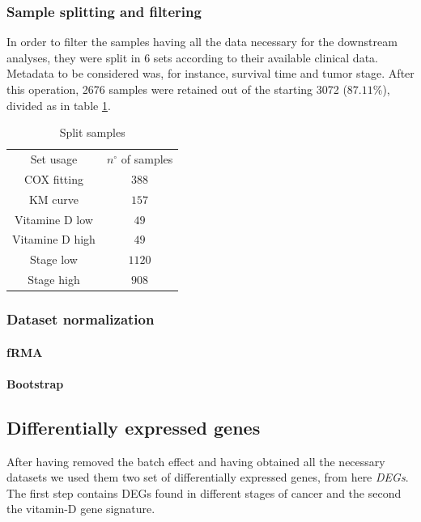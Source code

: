 \documentclass[fleqn,10pt]{SelfArx} %
\begin{document}
		\subsubsection{Sample splitting and filtering}
		In order to filter the samples having all the data necessary for the downstream analyses, they were split in 6 sets according to their available clinical data. Metadata to be considered was, for instance, survival time and tumor stage. After this operation, 2676 samples were retained out of the starting 3072 ($87.11\%$), divided as in table \ref{tab:samples_split}.

		\begin{table}[H]
			\centering
			\begin{tabular}{cc}
				\hline
				Set usage & $n^\circ$ of samples\\
				COX fitting & $388$\\
				KM curve & $157$\\
				Vitamine D low & $49$\\
				Vitamine D high & $49$\\
				Stage low & $1120$\\
				Stage high & $908$\\
				\hline
			\end{tabular}
			\caption{Split samples}
			\label{tab:samples_split}
		\end{table}

		\subsubsection{Dataset normalization}

			\paragraph{fRMA}

			\paragraph{Bootstrap}

	\subsection{Differentially expressed genes}
	After having removed the batch effect and having obtained all the necessary datasets we used them two set of differentially expressed genes, from here \emph{DEGs}.
	The first step contains DEGs found in different stages of cancer and the second the vitamin-D gene signature.
\end{document}
